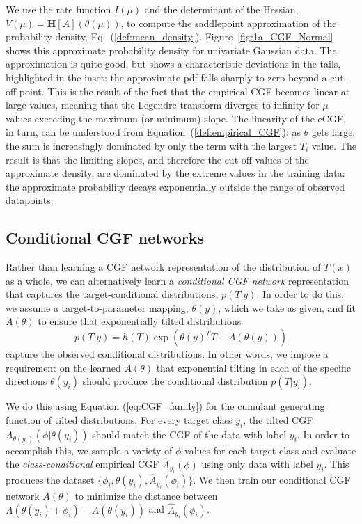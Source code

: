 \documentclass{article}      %
\begin{document}
We use the rate function $I(\mu)$ and the determinant of the Hessian, ${V(\mu) = \bm{H}[A](\theta(\mu))}$, to compute the saddlepoint approximation of the probability density, Eq.~(\ref{def:mean_density}).
Figure~\ref{fig:1a_CGF_Normal} shows this approximate probability density for univariate Gaussian data.
The approximation is quite good, but shows a characteristic deviations in the tails, highlighted in the inset:
the approximate pdf falls sharply to zero beyond a cut-off point. 
This is the result of the fact that the empirical CGF becomes linear at large values, meaning that the Legendre transform diverges to infinity for $\mu$ values exceeding the maximum (or minimum) slope.
The linearity of the eCGF, in turn, can be understood from Equation~(\ref{def:empirical_CGF}): as $\theta$ gets large, the sum is increasingly dominated by only the term with the largest $T_i$ value.
The result is that the limiting slopes, and therefore the cut-off values of the approximate density, are dominated by the extreme values in the training data: the approximate probability decays exponentially outside the range of observed datapoints.



\subsection{Conditional CGF networks}

Rather than learning a CGF network representation of the distribution of $T(x)$ as a whole, we can alternatively learn a \textit{conditional CGF network} representation that captures the target-conditional distributions, $p(T|y)$.
In order to do this, we assume a target-to-parameter mapping, $\theta(y)$, which we take as given, and fit $A(\theta)$ to ensure that exponentially tilted distributions
\begin{equation}
  p(T|y) = h(T) \exp(\theta(y)^T T - A(\theta(y))) \label{eq:class_conditional}
\end{equation}
capture the observed conditional distributions.
In other words, we impose a requirement on the learned $A(\theta)$ that exponential tilting in each of the specific directions $\theta(y_i)$ should produce the conditional distribution $p(T|y_i)$.

We do this using Equation (\ref{eq:CGF_family}) for the cumulant generating function of tilted distributions.
For every target class $y_i$, the tilted CGF $A_{\theta(y_i)}(\phi | \theta(y_i))$ should match the CGF of the data with label $y_i$.
In order to accomplish this, we sample a variety of $\phi$ values for each target class and evaluate the \textit{class-conditional} empirical CGF $\hat A_{y_i}(\phi)$ using only data with label $y_i$.
This produces the dataset $\{\phi_{i}, \theta(y_i), \hat A_{y_i}(\phi_i)\}$.
We then train our conditional CGF network $A(\theta)$ to minimize the distance between ${A(\theta(y_i) + \phi_i ) - A(\theta(y_i))}$ and $\hat A_{y_i}(\phi_i)$.
\end{document}
